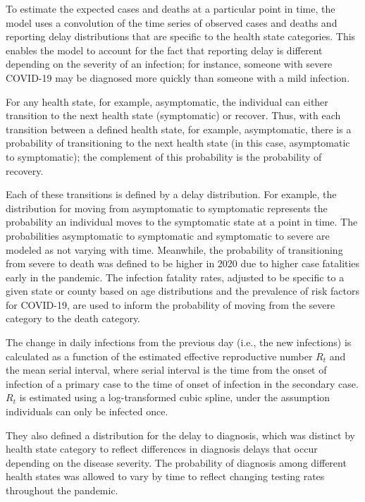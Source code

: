 \documentclass[12pt,twoside]{smiththesis}
\begin{document}
To estimate the expected cases and deaths at a particular point in time, the model uses a convolution of the time series of observed cases and deaths and reporting delay distributions that are specific to the health state categories. This enables the model to account for the fact that reporting delay is different depending on the severity of an infection; for instance, someone with severe COVID-19 may be diagnosed more quickly than someone with a mild infection.

For any health state, for example, asymptomatic, the individual can either transition to the next health state (symptomatic) or recover. Thus, with each transition between a defined health state, for example, asymptomatic, there is a probability of transitioning to the next health state (in this case, asymptomatic to symptomatic); the complement of this probability is the probability of recovery.

Each of these transitions is defined by a delay distribution. For example, the distribution for moving from asymptomatic to symptomatic represents the probability an individual moves to the symptomatic state at a point in time. The probabilities asymptomatic to symptomatic and symptomatic to severe are modeled as not varying with time. Meanwhile, the probability of transitioning from severe to death was defined to be higher in 2020 due to higher case fatalities early in the pandemic. The infection fatality rates, adjusted to be specific to a given state or county based on age distributions and the prevalence of risk factors for COVID-19, are used to inform the probability of moving from the severe category to the death category.

The change in daily infections from the previous day (i.e., the new infections) is calculated as a function of the estimated effective reproductive number \(R_t\) and the mean serial interval, where serial interval is the time from the onset of infection of a primary case to the time of onset of infection in the secondary case. \(R_t\) is estimated using a log-transformed cubic spline, under the assumption individuals can only be infected once.

They also defined a distribution for the delay to diagnosis, which was distinct by health state category to reflect differences in diagnosis delays that occur depending on the disease severity.
The probability of diagnosis among different health states was allowed to vary by time to reflect changing testing rates throughout the pandemic.
\end{document}
